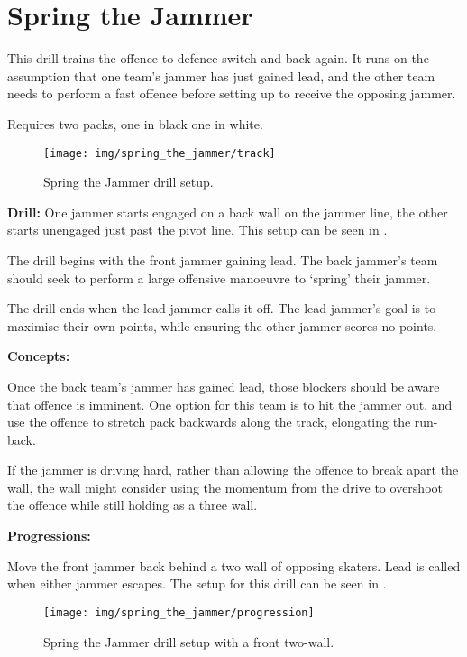 \section{Spring the Jammer}
\label{drill:scenarios/spring_the_jammer}

This drill trains the offence to defence switch and back again.
It runs on the assumption that one team's jammer has just gained lead, and the other team needs to perform a fast offence before setting up to receive the opposing jammer. 


Requires two packs, one in black one in white.

\begin{figure}
\centering
\texttt{[image: img/spring\_the\_jammer/track]}
\caption{Spring the Jammer drill setup. \label{drill:scenarios/spring_the_jammer}}
\end{figure}

{\bf Drill:}
One jammer starts engaged on a back wall on the jammer line, the other starts unengaged just past the pivot line. 
This setup can be seen in . 

The drill begins with the front jammer gaining lead.
The back jammer's team should seek to perform a large offensive manoeuvre to `spring' their jammer. 


The drill ends when the lead jammer calls it off. The lead jammer's goal is to maximise their own points, while ensuring the other jammer scores no points.  



{\bf Concepts:}

Once the back team's jammer has gained lead, those blockers should be aware that offence is imminent.  
One option for this team is to hit the jammer out, and use the offence to stretch pack backwards along the track, elongating the run-back.



If the jammer is driving hard, rather than allowing the offence to break apart the wall, the wall might consider using the momentum from the drive to overshoot the offence while still holding as a three wall.    


{\bf Progressions:}

Move the front jammer back behind a two wall of opposing skaters. Lead is called when either jammer escapes. 
The setup for this drill can be seen in . 

\begin{figure}
\centering
\texttt{[image: img/spring\_the\_jammer/progression]}
\caption{Spring the Jammer drill setup with a front two-wall. \label{drill:scenarios/spring_the_jammer_progression}}
\end{figure}


